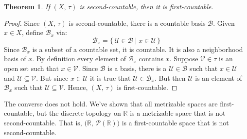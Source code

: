 \documentclass{article}
\theoremstyle{plain}
\newtheorem{theorem}{Theorem}[section]
\theoremstyle{normal}
\begin{document}
        \begin{theorem}
            If $(X,\,\tau)$ is second-countable, then it is first-countable.
        \end{theorem}
        \begin{proof}
            Since $(X,\,\tau)$ is second-countable, there is a countable
            basis $\mathcal{B}$. Given $x\in{X}$, define
            $\mathcal{B}_{x}$ via:
            \begin{equation}
                \mathcal{B}_{x}=\{\,\mathcal{U}\in\mathcal{B}\;|\;
                    x\in\mathcal{U}\,\}
            \end{equation}
            Since $\mathcal{B}_{x}$ is a subset of a countable set, it is
            countable. It is also a neighborhood basis of $x$. By definition
            every element of $\mathcal{B}_{x}$ contains $x$. Suppose
            $\mathcal{V}\in\tau$ is an open set such that
            $x\in\mathcal{V}$. Since $\mathcal{B}$ is a basis, there is a
            $\mathcal{U}\in\mathcal{B}$ such that
            $x\in\mathcal{U}$ and $\mathcal{U}\subseteq\mathcal{V}$. But since
            $x\in\mathcal{U}$ it is true that $\mathcal{U}\in\mathcal{B}_{x}$.
            But then $\mathcal{U}$ is an element of $\mathcal{B}_{x}$ such that
            $\mathcal{U}\subseteq\mathcal{V}$. Hence, $(X,\,\tau)$ is
            first-countable.
        \end{proof}
        The converse does not hold. We've shown that all metrizable spaces are
        first-countable, but the discrete topology on $\mathbb{R}$ is a
        metrizable space that is not second-countable. That is,
        $\big(\mathbb{R},\,\mathcal{P}(\mathbb{R})\big)$ is a first-countable
        space that is not second-countable.
\end{document}
